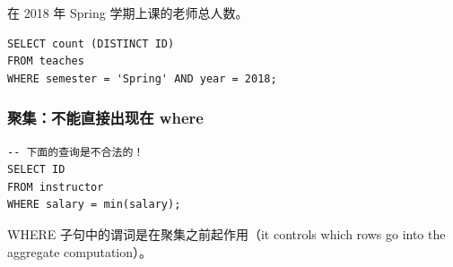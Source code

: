 \documentclass[aspectratio=169, 14pt]{beamer}
\begin{document}
\begin{frame}[fragile]
在 2018 年 Spring 学期上课的老师总人数。

\begin{verbatim}
SELECT count (DISTINCT ID)
FROM teaches
WHERE semester = 'Spring' AND year = 2018;
\end{verbatim}


\end{frame}

\begin{frame}[fragile]
    \frametitle{聚集：不能直接出现在 where}

    \begin{verbatim}
-- 下面的查询是不合法的！
SELECT ID
FROM instructor
WHERE salary = min(salary);
    \end{verbatim}  

WHERE 子句中的谓词是在聚集之前起作用（it controls which rows go into the aggregate computation）。

\end{frame}
\end{document}
